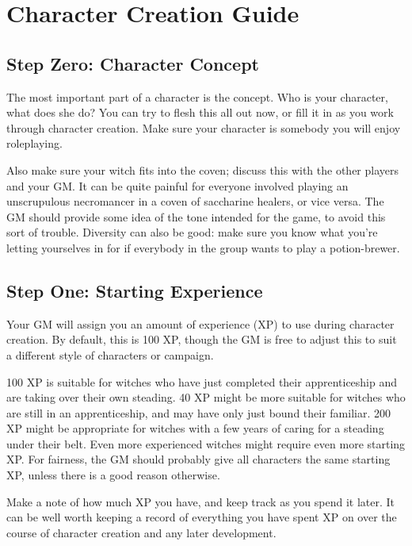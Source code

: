 \chapter{Character Creation Guide}

\section{Step Zero: Character Concept}

The most important part of a character is the concept.
Who is your character, what does she do?
You can try to flesh this all out now, or fill it in as you work through character creation.
Make sure your character is somebody you will enjoy roleplaying.

Also make sure your witch fits into the coven; discuss this with the other players and your GM.
It can be quite painful for everyone involved playing an unscrupulous necromancer in a coven of saccharine healers, or vice versa.
The GM should provide some idea of the tone intended for the game, to avoid this sort of trouble.
Diversity can also be good: make sure you know what you're letting yourselves in for if everybody in the group wants to play a potion-brewer.

\section{Step One: Starting Experience}

Your GM will assign you an amount of experience (XP) to use during character creation.
By default, this is 100 XP, though the GM is free to adjust this to suit a different style of characters or campaign.

100 XP is suitable for witches who have just completed their apprenticeship and are taking over their own steading.
40 XP might be more suitable for witches who are still in an apprenticeship, and may have only just bound their familiar.
200 XP might be appropriate for witches with a few years of caring for a steading under their belt.
Even more experienced witches might require even more starting XP.
For fairness, the GM should probably give all characters the same starting XP, unless there is a good reason otherwise.

Make a note of how much XP you have, and keep track as you spend it later.
It can be well worth keeping a record of everything you have spent XP on over the course of character creation and any later development.

